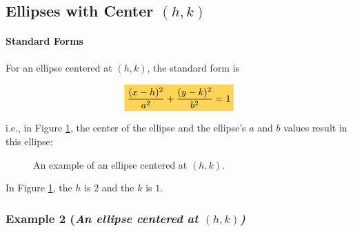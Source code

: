 \documentclass{article}
\newcommand{\highlight}[1]{%
  \colorbox{yellowOrange}{$\displaystyle#1$}}
\begin{document}
\newpage
\begin{flushleft}
  \subsection{Ellipses with Center $(h,k)$}

  \paragraph{Standard Forms} For an ellipse centered at $(h, k)$, the standard form is

\begin{align*}
  \highlight{\frac{(x - h)^2}{a^2} + \frac{(y - k)^2}{b^2} = 1}
\end{align*}

i.e., in Figure \ref{fig:ellipse4}, the center of the ellipse and the ellipse's $a$ and $b$ values result in this ellipse:

\end{flushleft}
\begin{figure}[H]
  \begin{center}
  \end{center}
  \caption{An example of an ellipse centered at $(h, k)$.}
  \label{fig:ellipse4}
\end{figure}
\begin{flushleft}

  In Figure \ref{fig:ellipse4}, the $h$ is $2$ and the $k$ is $1$.

\end{flushleft}

\newpage
\begin{flushleft}
  \subsubsection{Example 2 (\textit{An ellipse centered at $(h, k)$)}}
\end{flushleft}
\end{document}

